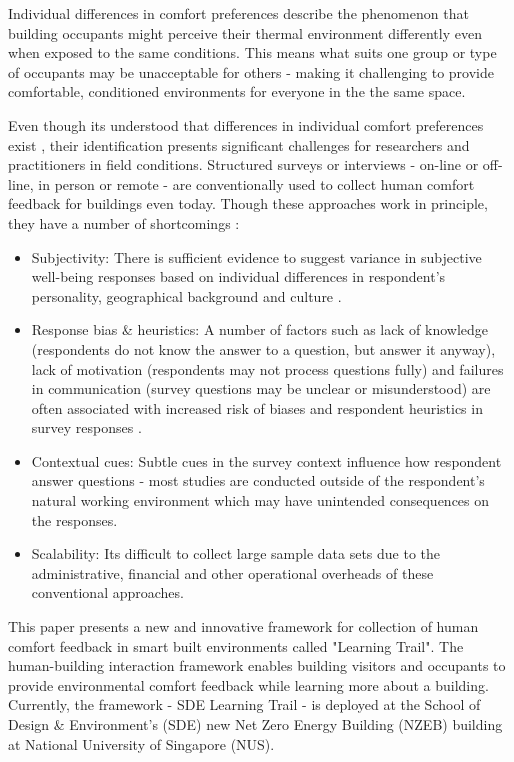

Individual differences in comfort preferences describe the phenomenon that building occupants might perceive their thermal environment differently even when exposed to the same conditions. This means what suits one group or type of occupants may be unacceptable for others - making it challenging to provide comfortable, conditioned environments for everyone in the the same space.

Even though its understood that differences in individual comfort preferences exist \cite{WANG2018181}, their identification presents significant challenges for researchers and practitioners in field conditions. Structured surveys or interviews - on-line or off-line, in person or remote - are conventionally used to collect human comfort feedback for buildings even today. Though these approaches work in principle, they have a number of shortcomings \cite{organisationforeconomicco-operationanddevelopment(oecd)_2013}:  

\begin{itemize}
  \item Subjectivity: There is sufficient evidence to suggest variance in subjective well-being responses based on individual differences in respondent's personality, geographical background and culture \cite{doi:10.1146/annurev.psych.54.101601.145056}.
  \item Response bias \& heuristics: A number of factors such as lack of knowledge (respondents do not know the answer to a question, but answer it anyway), lack of motivation (respondents may not process questions fully) and failures in communication (survey questions may be unclear or misunderstood) are often associated with increased risk of biases and respondent heuristics in survey responses \cite{bradburn2004asking}.
  \item Contextual cues: Subtle cues in the survey context influence how respondent answer questions \cite{krosnick1997seymour} - most studies are conducted outside of the respondent's natural working environment which may have unintended consequences on the responses. 
  \item Scalability: Its difficult to collect large sample data sets due to the administrative, financial and other operational overheads of these conventional approaches.
\end{itemize}


This paper presents a new and innovative framework for collection of human comfort feedback in smart built environments called "Learning Trail". The human-building interaction framework enables building visitors and occupants to provide environmental comfort feedback while learning more about a building. Currently, the framework - SDE Learning Trail - is deployed at the School of Design \& Environment's (SDE) new Net Zero Energy Building (NZEB) building at National University of Singapore (NUS). %

